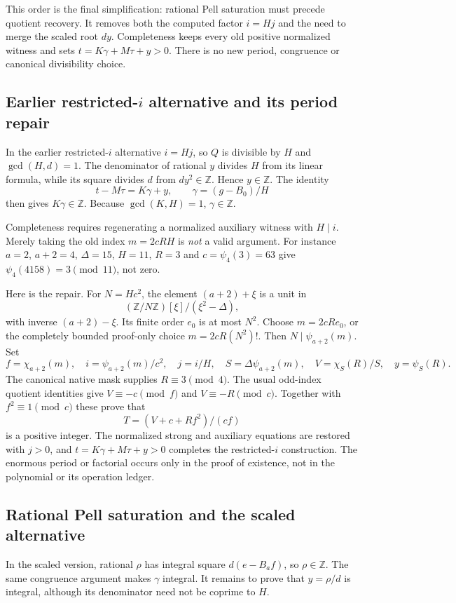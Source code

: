 \documentclass[11pt]{article}
\newcommand{\Z}{\mathbb Z}
\begin{document}
This order is the final simplification: rational Pell saturation must precede quotient recovery. It removes both the computed factor $i=Hj$ and the need to merge the scaled root $dy$. Completeness keeps every old positive normalized witness and sets $t=K\gamma+M\tau+y>0$. There is no new period, congruence or canonical divisibility choice.

\subsection{Earlier restricted-$i$ alternative and its period repair}

In the earlier restricted-$i$ alternative $i=Hj$, so $Q$ is divisible by $H$ and $\gcd(H,d)=1$. The denominator of rational $y$ divides $H$ from its linear formula, while its square divides $d$ from $dy^2\in\Z$. Hence $y\in\Z$. The identity
\[
 t-M\tau=K\gamma+y,\qquad \gamma=(g-B_0)/H
\]
then gives $K\gamma\in\Z$. Because $\gcd(K,H)=1$, $\gamma\in\Z$.

Completeness requires regenerating a normalized auxiliary witness with $H\mid i$. Merely taking the old index $m=2cRH$ is \emph{not} a valid argument. For instance $a=2$, $a+2=4$, $\Delta=15$, $H=11$, $R=3$ and $c=\psi_4(3)=63$ give $\psi_4(4158)=3\pmod{11}$, not zero.

Here is the repair. For $N=Hc^2$, the element $(a+2)+\xi$ is a unit in
\[
 (\Z/N\Z)[\xi]/(\xi^2-\Delta),
\]
with inverse $(a+2)-\xi$. Its finite order $e_0$ is at most $N^2$. Choose $m=2cR e_0$, or the completely bounded proof-only choice $m=2cR(N^2)!$. Then $N\mid\psi_{a+2}(m)$. Set
\[
 f=\chi_{a+2}(m),\quad i=\psi_{a+2}(m)/c^2,\quad j=i/H,
 \quad S=\Delta\psi_{a+2}(m),
 \quad V=\chi_S(R)/S,\quad y=\psi_S(R).
\]
The canonical native mask supplies $R\equiv3\pmod4$. The usual odd-index quotient identities give $V\equiv-c\pmod f$ and $V\equiv-R\pmod c$. Together with $f^2\equiv1\pmod c$ these prove that
\[
 T=(V+c+Rf^2)/(cf)
\]
is a positive integer. The normalized strong and auxiliary equations are restored with $j>0$, and $t=K\gamma+M\tau+y>0$ completes the restricted-$i$ construction. The enormous period or factorial occurs only in the proof of existence, not in the polynomial or its operation ledger.

\subsection{Rational Pell saturation and the scaled alternative}
In the scaled version, rational $\rho$ has integral square $d(e-B_af)$, so $\rho\in\Z$. The same congruence argument makes $\gamma$ integral. It remains to prove that $y=\rho/d$ is integral, although its denominator need not be coprime to $H$.
\end{document}
